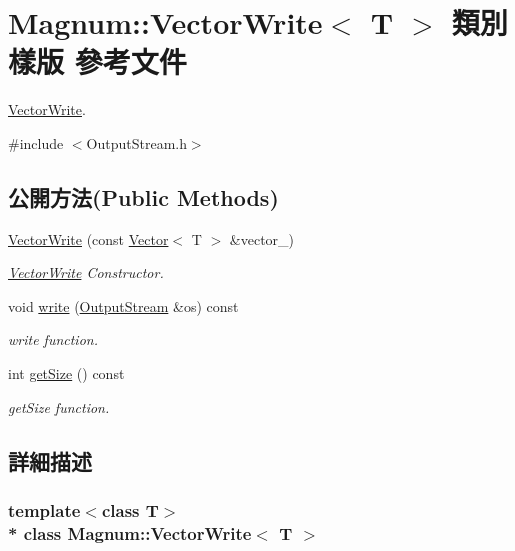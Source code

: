 \hypertarget{class_magnum_1_1_vector_write}{}\section{Magnum\+:\+:Vector\+Write$<$ T $>$ 類別 樣版 參考文件}
\label{class_magnum_1_1_vector_write}


\hyperlink{class_magnum_1_1_vector_write}{Vector\+Write}.  




{\ttfamily \#include $<$Output\+Stream.\+h$>$}

\subsection*{公開方法(Public Methods)}
\begin{DoxyCompactItemize}
\item 
\hyperlink{class_magnum_1_1_vector_write_ade083f9e0f0881e7d8c23c7221d5db49}{Vector\+Write} (const \hyperlink{class_magnum_1_1_vector}{Vector}$<$ T $>$ \&vector\+\_\+)
\begin{DoxyCompactList}\small\item\em \hyperlink{class_magnum_1_1_vector_write}{Vector\+Write} Constructor. \end{DoxyCompactList}\item 
void \hyperlink{class_magnum_1_1_vector_write_ac7d9e56a815366619263310bfb52c354}{write} (\hyperlink{class_magnum_1_1_output_stream}{Output\+Stream} \&os) const 
\begin{DoxyCompactList}\small\item\em write function. \end{DoxyCompactList}\item 
int \hyperlink{class_magnum_1_1_vector_write_a8ac97b47cb29c6c7c966dbb30f828949}{get\+Size} () const 
\begin{DoxyCompactList}\small\item\em get\+Size function. \end{DoxyCompactList}\end{DoxyCompactItemize}


\subsection{詳細描述}
\subsubsection*{template$<$class T$>$\\*
class Magnum\+::\+Vector\+Write$<$ T $>$}

